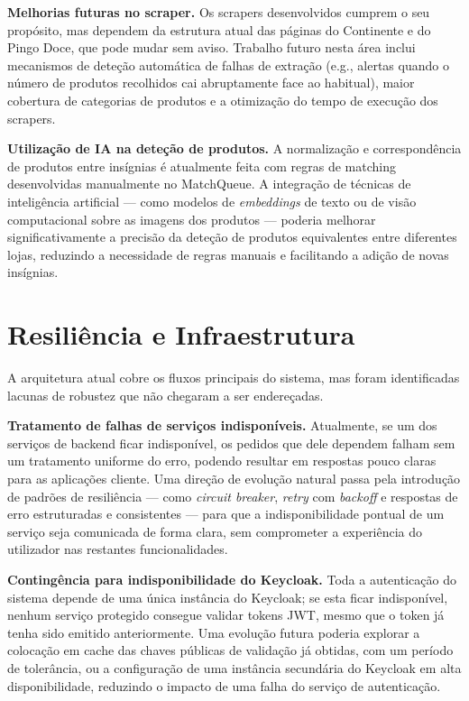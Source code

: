 \textbf{Melhorias futuras no scraper.} Os scrapers desenvolvidos cumprem o seu propósito, mas dependem da estrutura atual das páginas do Continente e do Pingo Doce, que pode mudar sem aviso. Trabalho futuro nesta área inclui mecanismos de deteção automática de falhas de extração (e.g., alertas quando o número de produtos recolhidos cai abruptamente face ao habitual), maior cobertura de categorias de produtos e a otimização do tempo de execução dos scrapers.

\textbf{Utilização de \ac{IA} na deteção de produtos.} A normalização e correspondência de produtos entre insígnias é atualmente feita com regras de matching desenvolvidas manualmente no MatchQueue. A integração de técnicas de inteligência artificial — como modelos de \textit{embeddings} de texto ou de visão computacional sobre as imagens dos produtos — poderia melhorar significativamente a precisão da deteção de produtos equivalentes entre diferentes lojas, reduzindo a necessidade de regras manuais e facilitando a adição de novas insígnias.

\section{Resiliência e Infraestrutura}
\label{sec:7.3}

A arquitetura atual cobre os fluxos principais do sistema, mas foram identificadas lacunas de robustez que não chegaram a ser endereçadas.

\textbf{Tratamento de falhas de serviços indisponíveis.} Atualmente, se um dos serviços de backend ficar indisponível, os pedidos que dele dependem falham sem um tratamento uniforme do erro, podendo resultar em respostas pouco claras para as aplicações cliente. Uma direção de evolução natural passa pela introdução de padrões de resiliência — como \textit{circuit breaker}, \textit{retry} com \textit{backoff} e respostas de erro estruturadas e consistentes — para que a indisponibilidade pontual de um serviço seja comunicada de forma clara, sem comprometer a experiência do utilizador nas restantes funcionalidades.

\textbf{Contingência para indisponibilidade do Keycloak.} Toda a autenticação do sistema depende de uma única instância do Keycloak; se esta ficar indisponível, nenhum serviço protegido consegue validar tokens \ac{JWT}, mesmo que o token já tenha sido emitido anteriormente. Uma evolução futura poderia explorar a colocação em cache das chaves públicas de validação já obtidas, com um período de tolerância, ou a configuração de uma instância secundária do Keycloak em alta disponibilidade, reduzindo o impacto de uma falha do serviço de autenticação.

